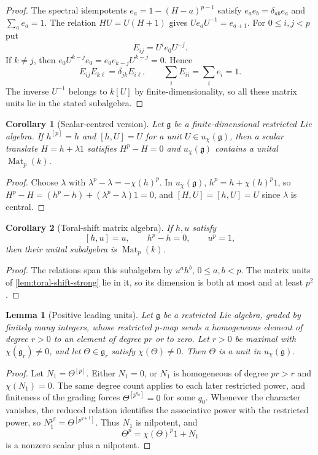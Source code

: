\documentclass[11pt,reqno]{amsart}
\newtheorem{lemma}[lemma]{Lemma}
\newtheorem{corollary}[corollary]{Corollary}
\theoremstyle{definition}
\theoremstyle{remark}
\theoremstyle{definition}
\newcommand{\Mat}{\operatorname{Mat}}
\begin{document}
\begin{proof}
The spectral idempotents $e_a=1-(H-a)^{p-1}$ satisfy
$e_ae_b=\delta_{ab}e_a$ and $\sum_ae_a=1$.
The relation $HU=U(H+1)$ gives
$Ue_aU^{-1}=e_{a+1}$. For $0\le i,j<p$ put
\[
 E_{ij}=U^ie_0U^{-j}.
\]
If $k\ne j$, then
$e_0U^{k-j}e_0=e_0e_{k-j}U^{k-j}=0$. Hence
\[
 E_{ij}E_{k\ell}=\delta_{jk}E_{i\ell},\qquad
 \sum_iE_{ii}=\sum_ie_i=1.
\]
The inverse $U^{-1}$ belongs to $k[U]$ by finite-dimensionality,
so all these matrix units lie in the stated subalgebra.
\end{proof}

\begin{corollary}[Scalar-centred version]\label{cor:toral-shift-strong}
Let $\mathfrak g$ be a finite-dimensional restricted Lie algebra.
If $h^{[p]}=h$ and
$[h,U]=U$ for a unit $U\in u_\chi(\mathfrak g)$, then a scalar translate
$H=h+\lambda1$ satisfies $H^p-H=0$ and
$u_\chi(\mathfrak g)$ contains a unital $\Mat_p(k)$.
\end{corollary}

\begin{proof}
Choose $\lambda$ with $\lambda^p-\lambda=-\chi(h)^p$.
In $u_\chi(\mathfrak g)$, $h^p=h+\chi(h)^p1$, so
$H^p-H=(h^p-h)+(\lambda^p-\lambda)1=0$, and $[H,U]=[h,U]=U$ since $\lambda$
is central.
\end{proof}

\begin{corollary}[Toral-shift matrix algebra]\label{lem:toral-shift}
If $h,u$ satisfy
\[
 [h,u]=u,\qquad h^p-h=0,\qquad u^p=1,
\]
then their unital subalgebra is $\Mat_p(k)$.
\end{corollary}

\begin{proof}
The relations span this subalgebra by $u^ah^b$, $0\le a,b<p$.
The matrix units of \cref{lem:toral-shift-strong} lie in it, so its
dimension is both at most and at least $p^2$.
\end{proof}

\begin{lemma}[Positive leading units]\label{lem:leading-unit}
Let $\mathfrak g$ be a restricted Lie algebra, graded by finitely many
integers, whose restricted $p$-map sends a homogeneous element of degree
$r>0$ to an element of degree $pr$ or to zero.  Let $r>0$ be maximal
with $\chi(\mathfrak g_r)\ne0$, and let $\Theta\in\mathfrak g_r$ satisfy
$\chi(\Theta)\ne0$.  Then $\Theta$ is a unit in $u_\chi(\mathfrak g)$.
\end{lemma}

\begin{proof}
Let $N_1=\Theta^{[p]}$.  Either $N_1=0$, or $N_1$ is homogeneous of
degree $pr>r$ and $\chi(N_1)=0$.  The same degree count applies to each
later restricted power, and finiteness of the grading forces
$\Theta^{[p^{q_0}]}=0$ for some $q_0$.  Whenever the character vanishes,
the reduced relation identifies the associative power with the restricted
power, so $N_1^{p^q}=\Theta^{[p^{q+1}]}$.  Thus $N_1$ is nilpotent, and
\[
 \Theta^p=\chi(\Theta)^p1+N_1
\]
is a nonzero scalar plus a nilpotent.
\end{proof}
\end{document}
